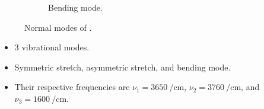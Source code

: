 \documentclass[../notes.tex]{subfiles}
\begin{document}
\begin{itemize}
\begin{figure}[h!]
\begin{subfigure}[b]{0.3\linewidth}
        \end{subfigure}
        \begin{subfigure}[b]{0.3\linewidth}
            \centering
            \caption{Bending mode.}
            \label{fig:H2ONormalModesc}
        \end{subfigure}
        \caption{Normal modes of .}
        \label{fig:H2ONormalModes}
    \end{figure}
    \begin{itemize}
        \item 3 vibrational modes.
        \item Symmetric stretch, asymmetric stretch, and bending mode.
        \item Their respective frequencies are $\nu_1=\SI{3650}{\per\centi\meter}$, $\nu_2=\SI{3760}{\per\centi\meter}$, and $\nu_3=\SI{1600}{\per\centi\meter}$.
    \end{itemize}
\end{itemize}
\end{document}
